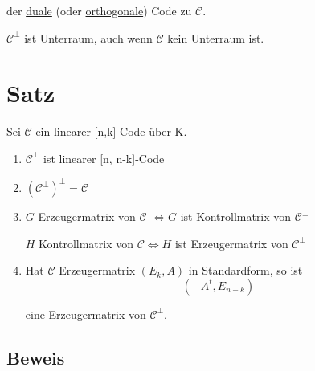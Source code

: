 \documentclass[a4paper, openany]{book}
\begin{document}
der \underline{duale} (oder \underline{orthogonale}) Code zu $\mathcal{C}$.

$\mathcal{C}^{\perp}$ ist Unterraum, auch wenn $\mathcal{C}$ kein Unterraum ist.

\section{Satz}

Sei $\mathcal{C}$ ein linearer [n,k]-Code über K. 

\begin{enumerate}[label=(\alph*)]
	\item $\mathcal{C}^{\perp}$ ist linearer [n, n-k]-Code

	\item $(\mathcal{C}^{\perp})^{\perp} = \mathcal{C}$

	\item $G$ Erzeugermatrix von $\mathcal{C}$ $\Leftrightarrow G$ ist Kontrollmatrix von $\mathcal{C}^{\perp}$

	$H$ Kontrollmatrix von $\mathcal{C} \Leftrightarrow H$ ist Erzeugermatrix von $\mathcal{C}^{\perp}$

	\item Hat $\mathcal{C}$ Erzeugermatrix $(E_k, A)$ in Standardform, so ist \[ (-A^t, E_{n-k}) \]

	eine Erzeugermatrix von $\mathcal{C}^{\perp}$.
\end{enumerate}

\subsection{Beweis}
\end{document}
